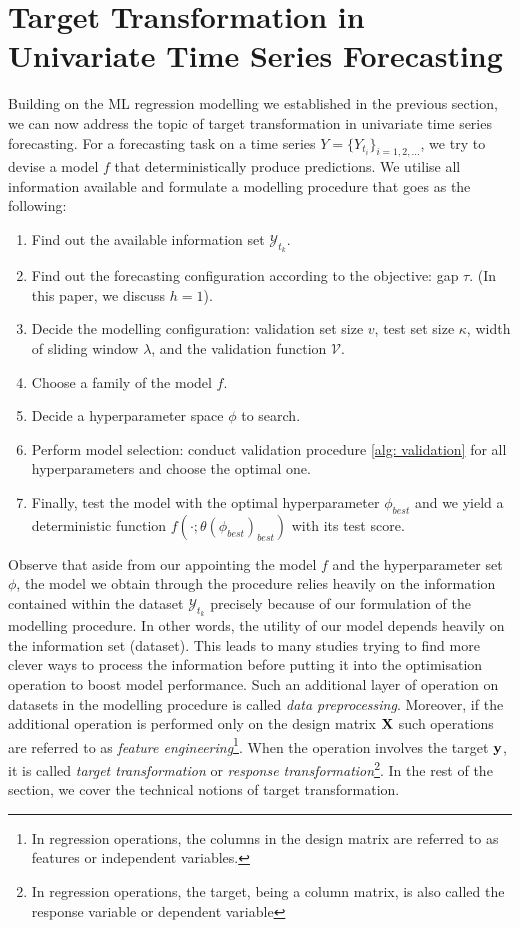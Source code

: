 \section{Target Transformation in Univariate Time Series Forecasting}

Building on the ML regression modelling we established in the previous section, we can now address the topic of target transformation in univariate time series forecasting. For a forecasting task on a time series $Y = \{ Y_{t_i} \}_{i = 1, 2, \ldots}$, we try to devise a model $f$ that deterministically produce predictions. We utilise all information available and formulate a modelling procedure that goes as the following:
\begin{enumerate}
    \item Find out the available information set $\mathcal{Y}_{t_k}$.
    \item Find out the forecasting configuration according to the objective: gap $\tau$. (In this paper, we discuss $h=1$).
    \item Decide the modelling configuration: validation set size $v$, test set size $\kappa$, width of sliding window $\lambda$, and the validation function $\mathcal{V}$.
    \item Choose a family of the model $f$.
    \item Decide a hyperparameter space $\phi$ to search.
    \item Perform model selection: conduct validation procedure \ref{alg: validation} for all hyperparameters and choose the optimal one.
    \item Finally, test the model with the optimal hyperparameter $\phi_{best}$ and we yield a deterministic function $f(\cdot;\theta(\phi_{best})_{best})$ with its test score.
\end{enumerate}
Observe that aside from our appointing the model $f$ and the hyperparameter set $\phi$, the model we obtain through the procedure relies heavily on the information contained within the dataset $\mathcal{Y}_{t_k}$ precisely because of our formulation of the modelling procedure. In other words, the utility of our model depends heavily on the information set (dataset). This leads to many studies trying to find more clever ways to process the information before putting it into the optimisation operation to boost model performance. Such an additional layer of operation on datasets in the modelling procedure is called \textit{data preprocessing}. Moreover, if the additional operation is performed only on the design matrix $\mathbf{X}$ such operations are referred to as \textit{feature engineering}\footnote{In regression operations, the columns in the design matrix are referred to as features or independent variables.}. When the operation involves the target $\mathbf{y}$, it is called \textit{target transformation} or \textit{response transformation}\footnote{In regression operations, the target, being a column matrix, is also called the response variable or dependent variable}. In the rest of the section, we cover the technical notions of target transformation.

